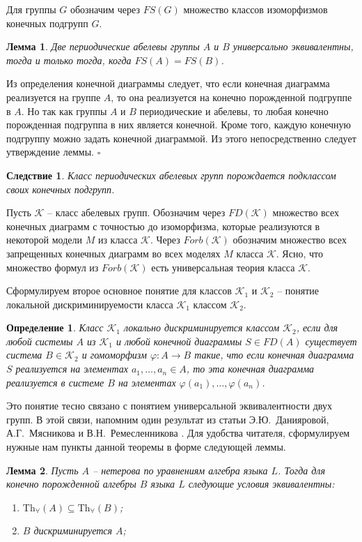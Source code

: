 \documentclass[a4paper,11pt,twoside]{article}
\newtheorem{lemma}{Лемма}[section]
\newtheorem{corollary}{Следствие}[section]
\newtheorem{definition}{Определение}[section]
\def\proof{{\noindent{\bf Доказательство.}} }
\def\K{{\mathcal{K}}}
\begin{document}
Для группы $G$ обозначим через $FS(G)$ множество классов изоморфизмов конечных подгрупп $G$.

\begin{lemma}\label{lemma:UnivEquivFS}
Две периодические абелевы группы $A$ и $B$ универсально эквивалентны, тогда и только тогда, когда $FS(A) = FS(B)$.
\end{lemma}
\proof Из определения конечной диаграммы следует, что если конечная диаграмма реализуется на группе $A$, то она реализуется на конечно порожденной подгруппе в $A$. Но так как группы $A$ и $B$ периодические и абелевы, то любая конечно порожденная подгруппа в них является конечной. Кроме того, каждую конечную подгруппу можно задать конечной диаграммой. Из этого непосредственно следует утверждение леммы. $\square$

\begin{corollary}\label{cor:ClassPerdiodicAbelinaGroup}
Класс периодических абелевых групп порождается подклассом своих конечных подгрупп.
\end{corollary}


Пусть $\K$ -- класс абелевых групп. Обозначим через $FD(\K)$ множество всех конечных диаграмм с точностью до изоморфизма, которые реализуются в некоторой модели $M$ из класса $\K$. Через $Forb(\K)$ обозначим множество всех запрещенных конечных диаграмм во всех моделях $M$ класса $\K$. Ясно, что множество формул из $Forb(\K)$ есть универсальная теория класса $\K$.


Сформулируем второе основное понятие для классов $\K_1$ и $\K_2$ -- понятие локальной дискриминируемости класса $\K_1$ классом $\K_2$.
\begin{definition}
Класс $\K_1$ локально дискриминируется классом $\K_2$, если для любой системы $A$ из $\K_1$ и любой конечной диаграммы $S \in FD(A)$ существует система $B \in \K_2$ и гомоморфизм $\varphi: A \rightarrow B$ такие, что если конечная диаграмма $S$ реализуется на элементах $a_1, \ldots, a_n \in A$, то эта конечная диаграмма реализуется в системе $B$ на элементах $\varphi(a_1), \ldots, \varphi(a_n)$.
\end{definition}

Это понятие тесно связано с понятием универсальной эквивалентности двух групп. В этой связи, напомним один результат из статьи Э.Ю.~Данияровой, А.Г.~Мясникова и В.Н.~Ремесленникова \cite{DMR1}. Для удобства читателя, сформулируем нужные нам пункты данной теоремы в форме следующей леммы.

\begin{lemma}\label{lemma:UnivEquiv}
Пусть $A$ -- нетерова по уравнениям алгебра языка $L$. Тогда для конечно порожденной алгебры $B$ языка $L$ следующие условия эквивалентны:
\begin{enumerate}
\item $\mathrm{Th}_{\forall}(A) \subseteq \mathrm{Th}_{\forall}(B)$;
\item $B$ дискриминируется $A$;
\end{enumerate}
\end{lemma}
\end{document}
